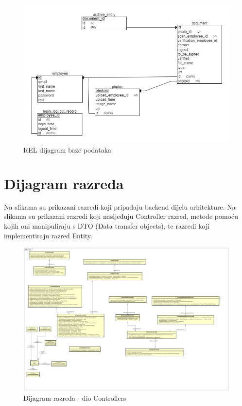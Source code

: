 					\begin{figure}[H]
					\includegraphics[scale=0.5]{slike/kompletici_v4_REL.PNG} %
					\centering
					\caption{REL dijagram baze podataka}
					\label{fig:promjene}
				\end{figure}
				
				
			
			\eject
			
			
		\section{Dijagram razreda}

		Na slikama su prikazani razredi koji pripadaju backend dijelu arhitekture. Na slikama su prikazani razredi koji nasljeđuju Controller razred, metode pomoću kojih oni manipuliraju s DTO (Data transfer objects), te razredi koji implementiraju razred Entity.
		
			\begin{figure}[H]
				\includegraphics[scale=0.2]{slike/ControlerDiagram.png} %
				\centering
				\caption{Dijagram razreda - dio Controllers}
				\label{fig:promjene}
			\end{figure}
			
